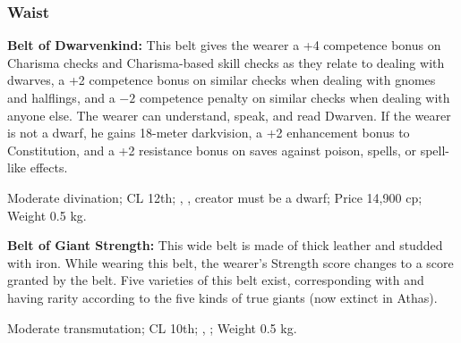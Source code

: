 \subsubsection{Waist}

\textbf{Belt of Dwarvenkind:} This belt gives the wearer a +4 competence bonus on Charisma checks and Charisma-based skill checks as they relate to dealing with dwarves, a +2 competence bonus on similar checks when dealing with gnomes and halflings, and a $-2$ competence penalty on similar checks when dealing with anyone else. The wearer can understand, speak, and read Dwarven. If the wearer is not a dwarf, he gains 18-meter darkvision, a +2 enhancement bonus to Constitution, and a +2 resistance bonus on saves against poison, spells, or spell-like effects.

Moderate divination; CL 12th; , , creator must be a dwarf; Price 14,900 cp; Weight 0.5 kg.

\textbf{Belt of Giant Strength:} This wide belt is made of thick leather and studded with iron. While wearing this belt, the wearer's Strength score changes to a score granted by the belt. Five varieties of this belt exist, corresponding with and having rarity according to the five kinds of true giants (now extinct in Athas).


Moderate transmutation; CL 10th; , ; Weight 0.5 kg.
